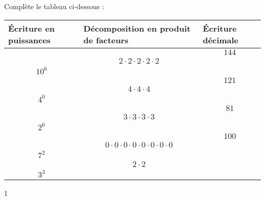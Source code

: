 \documentclass[a4paper,11pt]{report}
\begin{document}
\begin{exop}{
Complète le tableau ci-dessous : 
\begin{center}
{\renewcommand{\arraystretch}{1.6}
\begin{tabular}{|m{4.6cm}|m{4.6cm}|m{4.6cm}|}\hline
Écriture en puissances    & Décomposition en produit de facteurs  & Écriture décimale\\\hline
& & \multicolumn{1}{c|}{$144$} \\\hline
 & \multicolumn{1}{c|}{$2\cdot 2 \cdot 2 \cdot 2 \cdot 2$} & \\\hline
\multicolumn{1}{|c|}{$10^6$} & & \\\hline
& & \multicolumn{1}{c|}{$121$} \\\hline
  & \multicolumn{1}{c|}{$4 \cdot 4 \cdot 4$} & \\\hline
\multicolumn{1}{|c|}{$4^0$} & & \\\hline
& & \multicolumn{1}{c|}{$81$} \\\hline
 & \multicolumn{1}{c|}{$3\cdot 3 \cdot 3 \cdot 3 $} & \\\hline
\multicolumn{1}{|c|}{$2^6$} & & \\\hline
& & \multicolumn{1}{c|}{$100$} \\\hline
 & \multicolumn{1}{c|}{$0\cdot 0 \cdot 0 \cdot 0 \cdot 0 \cdot 0 \cdot 0 \cdot 0$} & \\\hline
\multicolumn{1}{|c|}{$7^2$} & & \\\hline
 & \multicolumn{1}{c|}{$2\cdot 2 $} & \\\hline
\multicolumn{1}{|c|}{$3^3$} & & \\\hline
\end{tabular}}
\end{center}}{1}
\end{exop}
\end{document}
